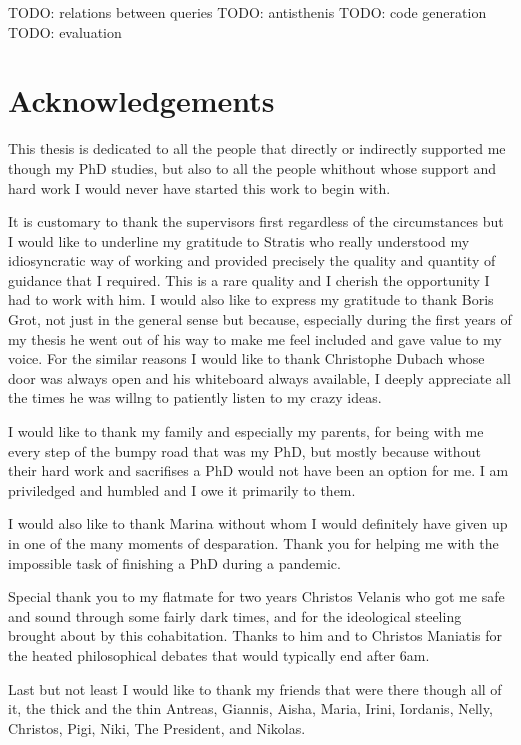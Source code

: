\begin{precontent}
TODO: relations between queries
TODO: antisthenis
TODO: code generation
TODO: evaluation

\chapter{Acknowledgements}%

This thesis is dedicated to all the people that directly or indirectly
supported me though my PhD studies, but also to all the people
whithout whose support and hard work I would never have started this
work to begin with.

It is customary to thank the supervisors first regardless of the
circumstances but I would like to underline my gratitude to Stratis
who really understood my idiosyncratic way of working and provided
precisely the quality and quantity of guidance that I required. This
is a rare quality and I cherish the opportunity I had to work with
him. I would also like to express my gratitude to thank Boris Grot,
not just in the general sense but because, especially during the first
years of my thesis he went out of his way to make me feel included and
gave value to my voice. For the similar reasons I would like to thank
Christophe Dubach whose door was always open and his whiteboard always
available, I deeply appreciate all the times he was willng to
patiently listen to my crazy ideas.

I would like to thank my family and especially my parents, for being
with me every step of the bumpy road that was my PhD, but mostly
because without their hard work and sacrifises a PhD would not have
been an option for me. I am priviledged and humbled and I owe it
primarily to them.

I would also like to thank Marina without whom I would definitely have
given up in one of the many moments of desparation. Thank you for
helping me with the impossible task of finishing a PhD during a
pandemic.

Special thank you to my flatmate for two years Christos Velanis who
got me safe and sound through some fairly dark times, and for the
ideological steeling brought about by this cohabitation. Thanks to him
and to Christos Maniatis for the heated philosophical debates that
would typically end after 6am.

Last but not least I would like to thank my friends that were there
though all of it, the thick and the thin Antreas, Giannis, Aisha,
Maria, Irini, Iordanis, Nelly, Christos, Pigi, Niki, The President,
and Nikolas.






\end{precontent}


\tableofcontents

\cleardoublepage
{}
{}
\listoffigures
\listoflistings

\cleardoublepage%
